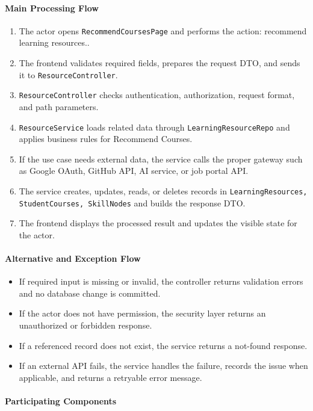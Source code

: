 \paragraph{Main Processing Flow}

\begin{enumerate}
    \item The actor opens \texttt{RecommendCoursesPage} and performs the action: recommend learning resources..
    \item The frontend validates required fields, prepares the request DTO, and sends it to \texttt{ResourceController}.
    \item \texttt{ResourceController} checks authentication, authorization, request format, and path parameters.
    \item \texttt{ResourceService} loads related data through \texttt{LearningResourceRepo} and applies business rules for Recommend Courses.
    \item If the use case needs external data, the service calls the proper gateway such as Google OAuth, GitHub API, AI service, or job portal API.
    \item The service creates, updates, reads, or deletes records in \texttt{LearningResources, StudentCourses, SkillNodes} and builds the response DTO.
    \item The frontend displays the processed result and updates the visible state for the actor.
\end{enumerate}

\paragraph{Alternative and Exception Flow}

\begin{itemize}
    \item If required input is missing or invalid, the controller returns validation errors and no database change is committed.
    \item If the actor does not have permission, the security layer returns an unauthorized or forbidden response.
    \item If a referenced record does not exist, the service returns a not-found response.
    \item If an external API fails, the service handles the failure, records the issue when applicable, and returns a retryable error message.
\end{itemize}

\paragraph{Participating Components}

